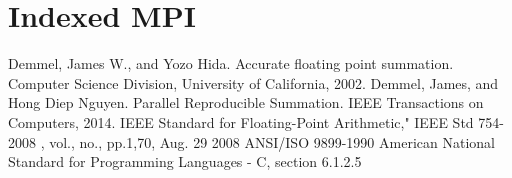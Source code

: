 \documentclass[12pt]{article}
\theoremstyle{plain}
\begin{document}
\section{Indexed MPI}
\begin{thebibliography}{9}
    Demmel, James W., and Yozo Hida. Accurate floating point summation. Computer Science Division, University of California, 2002.
    Demmel, James, and Hong Diep Nguyen. Parallel Reproducible Summation. IEEE Transactions on Computers, 2014.
    IEEE Standard for Floating-Point Arithmetic," IEEE Std 754-2008 , vol., no., pp.1,70, Aug. 29 2008
    ANSI/ISO 9899-1990 American National Standard for Programming Languages - C, section 6.1.2.5
\end{thebibliography}
\end{document}
